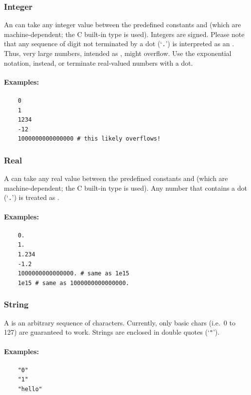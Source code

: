 \subsubsection{Integer}
\label{sec:integer}
An  can take any integer value between the predefined constants
 and  (which are machine-dependent; the C built-in type  is used).
Integers are signed.
Please note that any sequence of digit not terminated by a dot (`\texttt{.}')
is interpreted as an .
Thus, very large numbers, intended as , might overflow.
Use the exponential notation, instead, or terminate real-valued numbers with a dot.

\paragraph{Examples:}
\begin{verbatim}
    0
    1
    1234
    -12
    1000000000000000 # this likely overflows!
\end{verbatim}

\subsubsection{Real}
\label{sec:real}
A  can take any real value between the predefined constants
 and  (which are machine-dependent; the C built-in type  is used).
Any number that contains a dot (`\texttt{.}') is treated as .

\paragraph{Examples:}
\begin{verbatim}
    0.
    1.
    1.234
    -1.2
    1000000000000000. # same as 1e15
    1e15 # same as 1000000000000000.
\end{verbatim}

\subsubsection{String}
\label{sec:string}
A  is an arbitrary sequence of characters.
Currently, only basic chars (i.e.\ 0 to 127) are guaranteed to work.
Strings are enclosed in double quotes (`\texttt{"}').

\paragraph{Examples:}
\begin{verbatim}
    "0"
    "1"
    "hello"
\end{verbatim}

